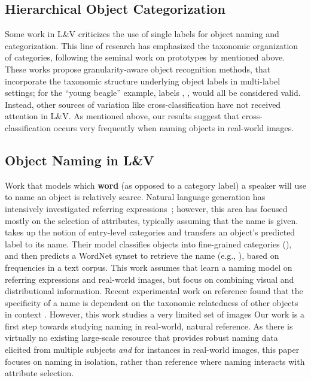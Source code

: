 \subsection{Hierarchical Object Categorization}

Some work in L\&V \cite{deng2014large,wang2014poodle,peterson2018learning} criticizes the use of single labels for object naming and categorization.
This line of research has emphasized the taxonomic organization of categories, following the seminal work on prototypes by  mentioned above.
These works propose granularity-aware object recognition methods, that incorporate the taxonomic structure underlying object labels in multi-label settings; for the ``young beagle'' example, labels , ,  would all be considered valid.
Instead, other sources of variation like cross-classification have not received attention in L\&V.
As mentioned above, our results suggest that cross-classification occurs very frequently when naming objects in real-world images.

\subsection{Object Naming in L\&V} 

Work that models which \textbf{word} (as opposed to a category label) a speaker will use to name an object is relatively scarce.
Natural language generation has intensively investigated referring expressions~\cite{dale:1995,krahmer:2012}; however, this area has focused mostly on the selection of attributes, typically assuming that the name is given.
 takes up the notion of entry-level categories and transfers an object's predicted label to its name.
Their model classifies objects into fine-grained categories (), and then predicts a WordNet synset to retrieve the name (e.g., ), based on frequencies in a text corpus.
This work assumes that 
  learn a naming model on referring expressions and real-world images, but focus on combining visual and distributional information. 
Recent experimental work on reference found that the specificity of a name is dependent on the taxonomic relatedness of other objects in context
\cite{rohde2012communicating,graf2016animal}. 
However, this work studies a very limited set of images 
Our work is a first step towards studying naming in real-world, natural reference.
As there is virtually no existing large-scale resource that provides robust naming data elicited from multiple subjects \textit{and} for instances in real-world images, this paper focuses on naming in isolation, rather than reference where naming interacts with attribute selection.

